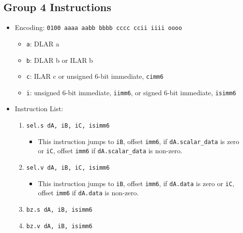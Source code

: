 \documentclass{article}
\begin{document}
	\subsection{Group 4 Instructions}
		\begin{itemize}
		\item Encoding:  \texttt{0100 aaaa aabb bbbb  cccc ccii iiii oooo}
			\begin{itemize}
			\item \texttt{a}:  DLAR a
			\item \texttt{b}:  DLAR b or ILAR b
			\item \texttt{c}:  ILAR c or unsigned 6-bit immediate,
				\texttt{cimm6}
			\item \texttt{i}:  unsigned 6-bit immediate, \texttt{iimm6},
				or signed 6-bit immediate, \texttt{isimm6}
			\end{itemize}
		\item Instruction List:
			\begin{enumerate}

			\item \texttt{sel.s dA, iB, iC, isimm6}
				\begin{itemize}
				\item This instruction jumps to \texttt{iB}, offset
					\texttt{imm6}, if \texttt{dA.scalar\_data} is zero or
					\texttt{iC}, offset \texttt{imm6} if
					\texttt{dA.scalar\_data} is non-zero.
				\end{itemize}
			\item \texttt{sel.v dA, iB, iC, isimm6}
				\begin{itemize}
				\item This instruction jumps to \texttt{iB}, offset
					\texttt{imm6}, if \texttt{dA.data} is zero or
					\texttt{iC}, offset \texttt{imm6} if
					\texttt{dA.data} is non-zero.
				\end{itemize}
			\item \texttt{bz.s dA, iB, isimm6}
			\item \texttt{bz.v dA, iB, isimm6}


\end{enumerate}
\end{itemize}
\end{document}
